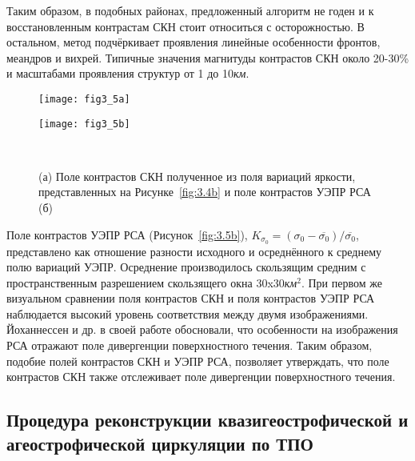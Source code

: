 Таким образом, в подобных районах, предложенный алгоритм не годен и к восстановленным контрастам СКН стоит относиться с осторожностью. В остальном, метод подчёркивает проявления линейные особенности фронтов, меандров и вихрей. Типичные значения магнитуды контрастов СКН около 20-30\% и масштабами проявления структур от 1 до 10\textit{км}.



\begin{figure}[H]
   	\centering
	\begin{minipage}{.47\textwidth}
	    \subcaptionbox{\label{fig:3.5a}}
		{\texttt{[image: fig3\_5a]}}
	\end{minipage}
	\hfill
	\begin{minipage}{.47\textwidth}
	    \subcaptionbox{\label{fig:3.5b}}
		{\texttt{[image: fig3\_5b]}}
	\end{minipage}
    \\
    \caption{(а) Поле контрастов СКН полученное из поля вариаций яркости, представленных на Рисунке~\ref{fig:3.4b} и поле контрастов УЭПР РСА (б)}
    \label{fig:3.5}
\end{figure}


Поле контрастов УЭПР РСА (Рисунок~\ref{fig:3.5b}), $K_{\sigma _{0} } =(\sigma _{0} -\overline{\sigma _{0} })/\overline{\sigma _{0} }$, представлено как отношение разности исходного и осреднённого к среднему полю вариаций УЭПР. Осреднение производилось скользящим средним с пространственным разрешением скользящего окна 30x30\textit{км${}^2$}. При первом же визуальном сравнении поля контрастов СКН и поля контрастов УЭПР РСА наблюдается высокий уровень соответствия между двумя изображениями. Йоханнессен и др. в своей работе обосновали, что особенности на изображения РСА отражают поле дивергенции поверхностного течения. Таким образом, подобие полей контрастов СКН и УЭПР РСА, позволяет утверждать, что поле контрастов СКН также отслеживает поле дивергенции поверхностного течения.



\subsection{Процедура реконструкции квазигеострофической и агеострофической циркуляции по ТПО} \label{sec:3.2.2}


